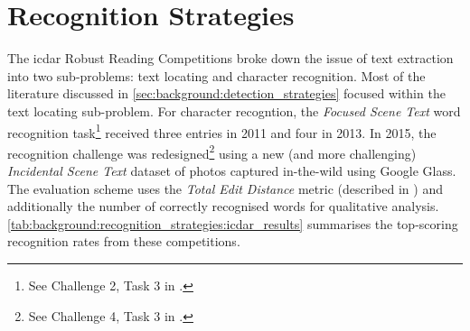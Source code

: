 \section{Recognition Strategies}
\label{sec:background:recognition_strategies}

The \gls{icdar} Robust Reading Competitions \citep{Lucas:2003iw, Lucas:2005bq, Shahab:2011hq, Karatzas:2013by, Karatzas:2015tj} broke down the issue of text extraction into two sub-problems: text locating and character recognition. Most of the literature discussed in \cref{sec:background:detection_strategies} focused within the text locating sub-problem. For character recogntion, the \textit{Focused Scene Text} word recognition task\footnote{See Challenge 2, Task 3 in \citep{Shahab:2011hq, Karatzas:2013by}.} received three entries in 2011 and four in 2013. In 2015, the recognition challenge was redesigned\footnote{See Challenge 4, Task 3 in \citep{Karatzas:2015tj}.} using a new (and more challenging) \textit{Incidental Scene Text} dataset of photos captured in-the-wild using Google Glass. The evaluation scheme uses the \textit{Total Edit Distance} metric (described in \citep{Karatzas:2013by}) and additionally the number of correctly recognised words for qualitative analysis. \cref{tab:background:recognition_strategies:icdar_results} summarises the top-scoring recognition rates from these competitions.

\begin{table}[bh]
  \centering
  \caption{Top-scoring word recognition results from ICDAR 2011--2015.}
  \label{tab:background:recognition_strategies:icdar_results}
\end{table}

